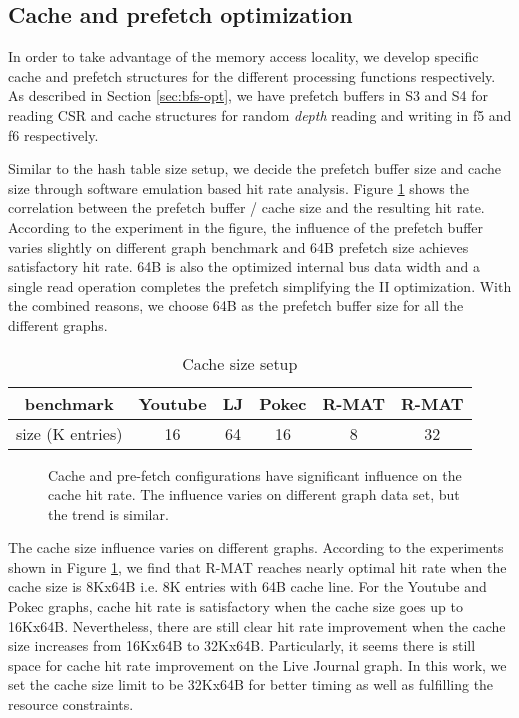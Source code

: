 \subsection{Cache and prefetch optimization}
In order to take advantage of the memory access locality, 
we develop specific cache and prefetch structures 
for the different processing functions respectively. 
As described in Section \ref{sec:bfs-opt}, we have 
prefetch buffers in S3 and S4 for reading CSR 
and cache structures for random \textit{depth} reading 
and writing in f5 
and f6 respectively. 

Similar to the hash table size setup, we decide the 
prefetch buffer size and cache size through software emulation 
based hit rate analysis. Figure \ref{fig:cache-hit} shows the correlation 
between the prefetch buffer / cache size and the resulting 
hit rate. According to the experiment in the figure,  
the influence of the prefetch buffer varies slightly on different 
graph benchmark and 64B prefetch size achieves satisfactory 
hit rate. 64B is also the optimized internal bus data width 
and a single read operation completes the prefetch simplifying the 
II optimization. With the combined reasons, we choose 64B as the 
prefetch buffer size for all the different graphs.

\begin{table}
    \centering
  \caption{Cache size setup}
  \label{tab:hash-size}
  \begin{tabular}{cccccc}
    \toprule
      benchmark & Youtube & LJ & Pokec & R-MAT\uppercase\expandafter{\romannumeral1}
      & R-MAT\uppercase\expandafter{\romannumeral2} \\
    \midrule
      size (K entries) & 16 & 64 & 16 & 8 & 32 \\
  \bottomrule
\end{tabular}
\end{table}

\begin{figure}
    \caption{Cache and pre-fetch configurations have significant influence on the cache hit rate.
    The influence varies on different graph data set, but the trend is similar.}
\label{fig:cache-hit}
\end{figure}

The cache size influence varies on different graphs. According to the experiments 
shown in Figure \ref{fig:cache-hit}, we find that R-MAT\uppercase\expandafter{} 
reaches nearly optimal hit rate when the cache size is 8Kx64B i.e. 8K entries with 64B cache line.
For the Youtube and Pokec graphs, cache hit rate is satisfactory when the cache size goes up to 
16Kx64B. Nevertheless, there are still clear hit rate improvement when the cache size increases from 
16Kx64B to 32Kx64B. Particularly, it seems there is still space for cache hit rate 
improvement on the Live Journal graph. In this work, we set the cache size limit to be 32Kx64B for 
better timing as well as fulfilling the resource constraints.

